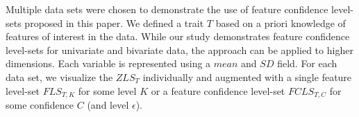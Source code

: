 Multiple data sets were chosen to demonstrate the use of feature confidence level-sets proposed in this paper.
%
We defined a trait $T$ based on a priori knowledge of features of interest in the data.
%
While our study demonstrates feature confidence level-sets for univariate and bivariate data, the approach can be applied to higher dimensions.
%
Each variable is represented using a $mean$ and $SD$ field.
%
For each data set, we visualize the $ZLS_{T}$ individually and augmented with a single feature level-set $FLS_{T,K}$ for some level $K$ or a feature confidence level-set $FCLS_{T,C}$ for some confidence $C$ (and level $\epsilon$).






